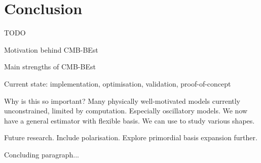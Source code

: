 \chapter{Conclusion}

TODO

Motivation behind CMB-BEst

Main strengths of CMB-BEst

Current state: implementation, optimisation, validation, proof-of-concept

Why is this so important? Many physically well-motivated models currently unconstrained, limited by computation. Especially oscillatory models. We now have a general estimator with flexible basis. We can use to study various shapes.

Future research. Include polarisation. Explore primordial basis expansion further.

Concluding paragraph... 


